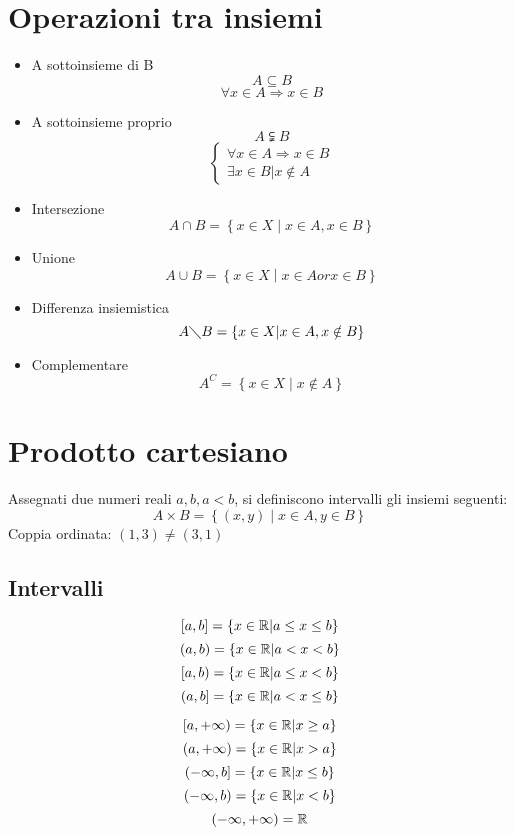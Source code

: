 \section{Operazioni tra insiemi}
\begin{itemize}
  \item A sottoinsieme di B
    \[A \subseteq  B\]
    \[\forall x \in A \Rightarrow x \in B\]
  \item A sottoinsieme proprio
    \[A \subsetneqq  B\]
    \[
      \begin{cases}
        \forall x \in A \Rightarrow x \in B \\
        \exists x \in B | x \notin A
        \end{cases}
      \]
    \item Intersezione
      \[A \cap B = \left\{ x \in X \middle| x \in A, x \in B\right\}\]
    \item Unione
      \[A \cup B = \left\{ x \in X \middle| x \in A or x \in B\right\}\]
    \item Differenza insiemistica
      \[A \diagdown B = \left\{ x \in X \middle| x \in A, x \notin B\right\}\]
    \item Complementare
      \[A^C = \left\{ x \in X \middle| x \notin A \right\}\]
\end{itemize}

\section{Prodotto cartesiano}
Assegnati due numeri reali $a, b, a < b$, si definiscono intervalli gli insiemi seguenti:
\[A\times B = \left\{ (x,y) \middle| x\in A, y\in B\right\}\]
Coppia ordinata: $(1,3) \neq (3,1)$
\subsection{Intervalli}
\[[a,b] = \left\{ x\in \mathbb{R} \middle| a \leq x \leq b \right\}\]
\[(a,b) = \left\{ x\in \mathbb{R} \middle| a < x < b \right\}\]
\[[a,b) = \left\{ x\in \mathbb{R} \middle| a \leq x < b \right\}\]
\[(a,b] = \left\{ x\in \mathbb{R} \middle| a < x \leq b \right\}\]

\[[a,+\infty) = \left\{ x\in \mathbb{R} \middle| x \geq a \right\}\]
\[(a,+\infty) = \left\{ x\in \mathbb{R} \middle| x > a \right\}\]
\[(-\infty,b] = \left\{ x\in \mathbb{R} \middle| x \leq b \right\}\]
\[(-\infty,b) = \left\{ x\in \mathbb{R} \middle| x < b \right\}\]
\[(-\infty,+\infty) = \mathbb{R}\]

